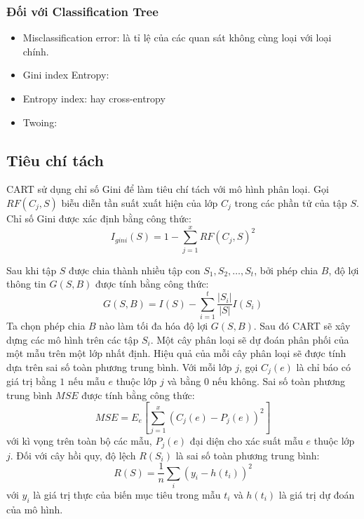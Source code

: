 \subsubsection{Đối với Classification Tree}
\begin{itemize}
\item Misclassification error: là tỉ lệ của các quan sát không cùng loại với loại chính. 
\item Gini index  Entropy: %
\item Entropy index: hay cross-entropy %
\item Twoing:%
\end{itemize}

\subsection{Tiêu chí tách}
CART sử dụng chỉ số Gini để làm tiêu chí tách với mô hình phân loại. Gọi $RF(C_j,S)$ biễu diễn tần suất xuất hiện của lớp $C_j$ trong các phần tử của tập $S$. Chỉ số Gini được xác định bằng công thức:
$$I_{gini}(S)=1- \sum^x_{j=1}RF(C_j,S)^2$$

Sau khi tập $S$ được chia thành nhiều tập con $S_1,S_2,\ldots,S_t$, bởi phép chia $B$, độ lợi thông tin $G(S,B)$ được tính bằng công thức:
$$G(S,B) = I(S) - \sum^t_{i=1}\frac{|S_i|}{|S|}I(S_i)$$
Ta chọn phép chia $B$ nào làm tối đa hóa độ lợi $G(S,B)$.
Sau đó CART sẽ xây dựng các mô hình trên các tập $S_i$. Một cây phân loại sẽ dự đoán phân phối của một mẫu trên một lớp nhất định. Hiệu quả của mỗi cây phân loại sẽ được tính dựa trên sai số toàn phương trung bình. Với mỗi lớp $j$, gọi $C_j(e)$ là chỉ báo có giá trị bằng $1$ nếu mẫu $e$ thuộc lớp $j$ và bằng $0$ nếu không. Sai số toàn phương trung bình $MSE$ được tính bằng công thức:
$$MSE=E_e\left[\sum^x_{j=1}(C_j(e)-P_j(e))^2\right]$$
với kì vọng trên toàn bộ các mẫu, $P_j(e)$ đại diện cho xác suất mẫu $e$ thuộc lớp $j$. Đối với cây hồi quy, độ lệch  $R(S_i)$ là sai số toàn phương trung bình:
$$R(S) = \frac{1}{n}\sum_i(y_i - h(t_i))^2$$
với $y_i$ là giá trị thực của biến mục tiêu trong mẫu $t_i$ và $h(t_i)$ là giá trị dự đoán của mô hình.\\


